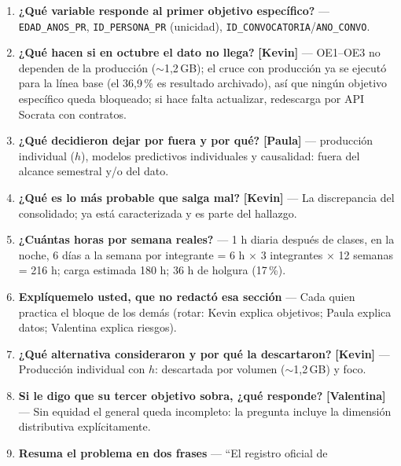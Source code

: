 \documentclass[11pt,a4paper]{article}
\newcommand{\quien}[1]{\textbf{[#1]}}
\begin{document}
\begin{enumerate}[label=\textbf{P\arabic*.}]
        \quien{Kevin} --- Sí: XLSX verificado con 50\,891 filas $\times$ 30
        columnas; \textbf{26\,662 personas únicas} (\texttt{ID\_PERSONA\_PR});
        3 convocatorias (781/2017, 833/2018 y 894/2021). Ojo: la 833 es ``de
        2018'', pero su \texttt{ANO\_CONVO} dice 06/12/2019 (fecha de
        resolución): el ``2019'' no es una cuarta convocatoria.
  \item \textbf{¿Qué variable responde al primer objetivo específico?} ---
        \texttt{EDAD\_ANOS\_PR}, \texttt{ID\_PERSONA\_PR} (unicidad),
        \texttt{ID\_CONVOCATORIA}/\texttt{ANO\_CONVO}.
  \item \textbf{¿Qué hacen si en octubre el dato no llega?} \quien{Kevin} ---
        OE1--OE3 no dependen de la producción ($\sim$1,2\,GB); el cruce con
        producción ya se ejecutó para la línea base (el 36,9\,\% es resultado
        archivado), así que ningún objetivo específico queda bloqueado; si hace
        falta actualizar, redescarga por API Socrata con contratos.
  \item \textbf{¿Qué decidieron dejar por fuera y por qué?} \quien{Paula} ---
        producción individual ($h$), modelos predictivos individuales y
        causalidad: fuera del alcance semestral y/o del dato.
  \item \textbf{¿Qué es lo más probable que salga mal?} \quien{Kevin} --- La
        discrepancia del consolidado; ya está caracterizada y es parte del
        hallazgo.
  \item \textbf{¿Cuántas horas por semana reales?} --- 1 h diaria después de
        clases, en la noche, 6 días a la semana por integrante = 6 h $\times$
        3 integrantes $\times$ 12 semanas = 216 h; carga estimada 180 h; 36 h
        de holgura (17\,\%).
  \item \textbf{Explíquemelo usted, que no redactó esa sección} --- Cada quien
        practica el bloque de los demás (rotar: Kevin explica objetivos; Paula
        explica datos; Valentina explica riesgos).
  \item \textbf{¿Qué alternativa consideraron y por qué la descartaron?}
        \quien{Kevin} --- Producción individual con $h$: descartada por volumen
        ($\sim$1,2\,GB) y foco.
  \item \textbf{Si le digo que su tercer objetivo sobra, ¿qué responde?}
        \quien{Valentina} --- Sin equidad el general queda incompleto: la
        pregunta incluye la dimensión distributiva explícitamente.
  \item \textbf{Resuma el problema en dos frases} --- ``El registro oficial de

\end{enumerate}
\end{document}
